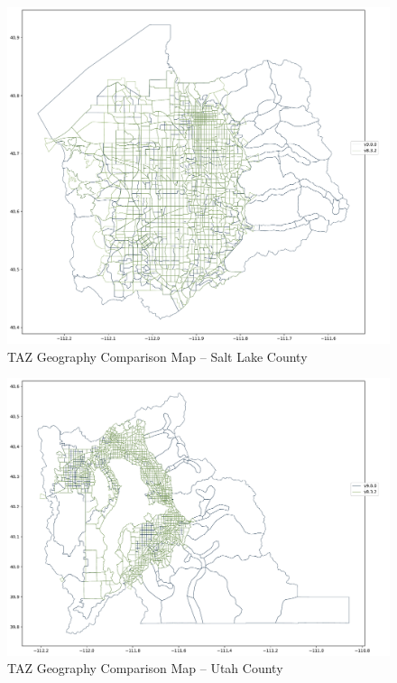 \documentclass[
  letterpaper,
  DIV=11,
  numbers=noendperiod]{scrreprt}
\begin{document}
\begin{figure}[H]

{\centering \includegraphics{v9x/v900/whats-new/2-inputdata_files/figure-pdf/fig-taz-compare-sl-pdf-output-1.pdf}

}

\caption{\label{fig-taz-compare-sl-pdf}TAZ Geography Comparison Map --
Salt Lake County}

\end{figure}

\begin{figure}[H]

{\centering \includegraphics{v9x/v900/whats-new/2-inputdata_files/figure-pdf/fig-taz-compare-utah-pdf-output-1.pdf}

}

\caption{\label{fig-taz-compare-utah-pdf}TAZ Geography Comparison Map --
Utah County}

\end{figure}
\end{document}
